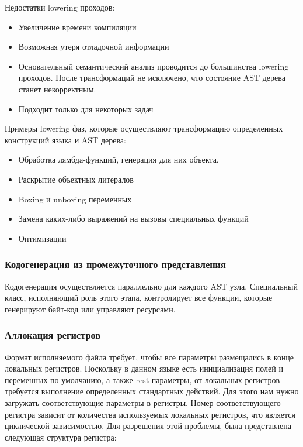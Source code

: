 Недостатки lowering проходов:

\begin{itemize}[left=2em]
    \item Увеличение времени компиляции
    \item Возможная утеря отладочной информации
    \item Основательный семантический анализ проводится до большинства lowering проходов.
    После трансформаций не исключено, что состояние AST дерева станет некорректным.
    \item Подходит только для некоторых задач
\end{itemize}

Примеры lowering фаз, которые осуществляют трансформацию определенных конструкций языка и AST дерева:

\begin{itemize}[left=2em]
    \item Обработка лямбда-функций, генерация для них объекта.
    \item Раскрытие объектных литералов
    \item Boxing и unboxing переменных
    \item Замена каких-либо выражений на вызовы специальных функций
    \item Оптимизации
\end{itemize}

\subsubsection{Кодогенерация из промежуточного представления}

Кодогенерация осуществляется параллельно для каждого AST узла.
Специальный класс, исполняющий роль этого этапа, контролирует все функции, которые генерируют байт-код или
управляют ресурсами.

\subsubsection{Аллокация регистров}

Формат исполняемого файла требует, чтобы все параметры размещались в конце локальных регистров.
Поскольку в данном языке есть инициализация полей и переменных по умолчанию, а также rest параметры, от локальных
регистров требуется выполнение определенных стандартных действий.
Для этого нам нужно загружать соответствующие параметры в регистры.
Номер соответствующего регистра зависит от количества используемых локальных регистров, что является циклической
зависимостью.
Для разрешения этой проблемы, была представлена следующая структура регистра:

